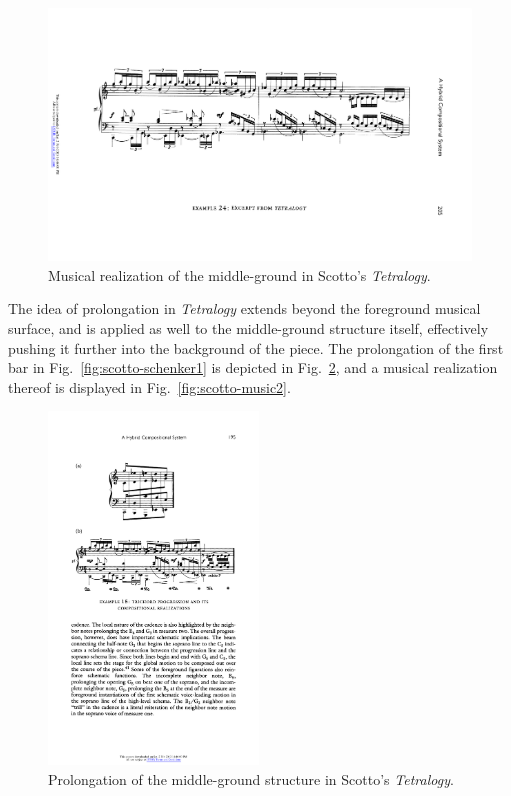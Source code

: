 \begin{example}
	\begin{figure}[htbp]
    	\centering
    	\includegraphics[width=6.5in]{figures/scotto-music1.pdf}
		\caption[Musical realization of the middle-ground in Scotto's \emph{Tetralogy}]{Musical realization of the middle-ground in Scotto's \emph{Tetralogy}.}
    	\label{fig:scotto-music1}
	\end{figure}
	
	\noindent The idea of prolongation in \emph{Tetralogy} extends beyond the foreground musical surface, and is applied as well to the middle-ground structure itself, effectively pushing it further into the background of the piece. The prolongation of the first bar in Fig.~\ref{fig:scotto-schenker1} is depicted in Fig.~\ref{fig:scotto-schenker2}, and a musical realization thereof is displayed in Fig.~\ref{fig:scotto-music2}. 
	
	\begin{figure}[htbp]
    	\centering
    	\includegraphics[width=2.2in]{figures/scotto-schenker2.pdf}
    	\caption[Prolongation of the middle-ground structure in Scotto's \emph{Tetralogy}]{Prolongation of the middle-ground structure in Scotto's \emph{Tetralogy}.}
    	\label{fig:scotto-schenker2}
	\end{figure}
	

\end{example}
